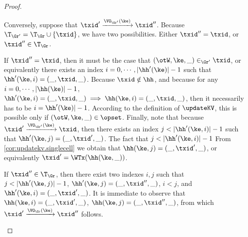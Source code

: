 \begin{proof}
\begin{enumerate}
Conversely, suppose that $\txid' \xrightarrow{\VO_{\Gr'}(\ke)} \txid''$. Because 
$\T_{\Gr'} = \T_{\Gr} \cup \{ \txid \}$, we have two possibilities. Either $\txid'' = \txid$, 
or $\txid'' \in \T_{\Gr}$. 

If $\txid'' = \txid$, then it must be the case that $(\otW, \ke, \_) \in_{\Gr'} \txid$, 
or equivalently there exists an index $i=0,\cdots, \lvert \hh'(\ke) \rvert -1 $ such that 
$\hh'(\ke, i) = (\_, \txid, \_)$. Because $\txid \notin \hh$, and because for any 
$i = 0, \cdots, \lvert \hh(\ke) \rvert - 1$, $\hh'(\ke, i) = (\_, \txid, \_) \implies 
\hh(\ke, i) = (\_, \txid, \_)$, then it necessarily has to be $i = \hh'(\ke) \rvert - 1$. 
According to the definition of $\updateKV$, this is possible only if $(\otW,\ke, \_) \in \opset$. 
Finally, note that because $\txid' \xrightarrow{\VO_{\Gr'}(\ke)} \txid$, then 
there exists an index $j < \lvert \hh'(\ke, i) \rvert - 1$ such that 
$\hh'(\ke, j) = (\_, \txid' ,\_)$. The fact that $j < \lvert \hh'(\ke, i) \rvert - 1$ 
From \cref{cor:updatekv.singlecell} we obtain that $\hh(\ke, j) = (\_, \txid', \_)$, 
or equivalently $\txid' = \WTx(\hh(\ke, \_))$. 

If $\txid'' \in \T_{\Gr}$, then there exist two indexes $i,j$ such that 
$j < \lvert \hh'(\ke, j) \rvert - 1$, $\hh'(\ke, j) = (\_, \txid'', \_)$, 
$i < j$, and $\hh'(\ke, i) = (\_, \txid', \_)$. It is immediate to observe 
that $\hh(\ke, i) = (\_, \txid', \_)$, $\hh(\ke, j) = (\_, \txid'', \_)$, 
from which $\txid' \xrightarrow{\VO_{\Gr}(\ke)} \txid''$ follows. 

\end{enumerate}
\end{proof}

